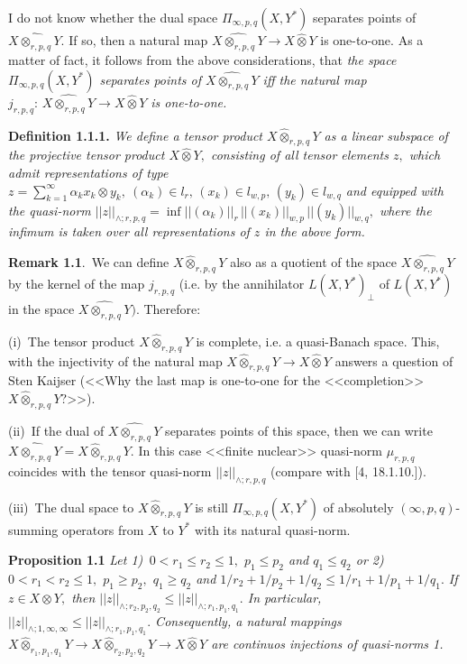  I do not know whether the dual space $\Pi_{\infty,p,q}(X, Y^*)$ sepa\-ra\-tes
 points of $\widehat{X\otimes_{r,p,q} Y}.$ If so, then a natural map
   $\widehat{X\otimes_{r,p,q} Y}\to X\widehat\otimes Y$ is one-to-one. As a matter of fact,
   it follows from the above considerations, that
 {\it the space $\Pi_{\infty,p,q}(X, Y^*)$ separates
 points of $\widehat{X\otimes_{r,p,q} Y}$ iff the natural map
   $j_{r,p,q}:\, \widehat{X\otimes_{r,p,q} Y}\to X\widehat\otimes Y$ is one-to-one.}
       \smallskip

 \textbf{Definition 1.1.1.}  {\it
 We define a tensor product $X\widehat\otimes_{r,p,q} Y$ as a linear subspace of
 the projective tensor product $X\widehat\otimes Y,$ consisting of all tensor elements $z,$
 which admit representations of type
 $
  z=\sum_{k=1}^\infty \alpha_k x_k\otimes y_k,\
  (\alpha_k)\in l_r,\, (x_k)\in l_{w,p},\, (y_k)\in l_{w,q}
 $
 and equipped with the quasi-norm $||z||_{\land\!; r,p,q}= \inf ||(\alpha_k)||_r\,
  ||(x_k)||_{w,p}\, ||(y_k)||_{w,q},$ where the infimum is taken over all
  representations of $z$ in the above form.
  }
       \smallskip

 \textbf{Remark 1.1}.\,
  We can define $X\widehat\otimes_{r,p,q} Y$ also as a quotient of the space $\widehat{X\otimes_{r,p,q} Y}$
 by the kernel of the map $j_{r,p,q}$ (i.e. by the annihilator $L(X,Y^*)_{\perp}$ of
$L(X,Y^*)$ in the space $\widehat{X\otimes_{r,p,q} Y}).$ Therefore:

 (i)\,
 The tensor product $X\widehat\otimes_{r,p,q} Y$ is complete, i.e. a quasi-Banach space.
This, with the injectivity of the natural map $X\widehat\otimes_{r,p,q} Y\to X\widehat\otimes Y$
answers a  question of Sten Kaijser (<<Why the last map is one-to-one
for the <<completion>> $X\widehat\otimes_{r,p,q} Y$?>>).

 (ii)\,
If the dual of $\widehat{X\otimes_{r,p,q} Y}$ separates points of this space,
 then we can write $\widehat{X\otimes_{r,p,q} Y}= X\widehat\otimes_{r,p,q} Y.$ In this case
 <<finite nuclear>> quasi-norm $\mu_{r,p,q}$ coincides with the tensor quasi-norm
$||z||_{\land\!; r,p,q}$ (compare with [4, 18.1.10.]).

(iii)\,
 The dual space to $X\widehat\otimes_{r,p,q} Y$ is still
 $\Pi_{\infty,p,q}(X,Y^*)$ of absolutely $(\infty,p,q)$-summing operators
from $X$ to $Y^*$ with its natural quasi-norm.
                        \smallskip


\textbf{Proposition 1.1} {\it
Let
1)\,
$0<r_1\leqslant r_2\leqslant1,$ $p_1\leqslant p_2$ and $q_1\leqslant q_2$
or
2)\,
 $0<r_1< r_2\leqslant1,$ $p_1\geqslant p_2,$ $q_1\geqslant q_2$ and
 $1/r_2+1/p_2+1/q_2\leqslant 1/r_1+1/p_1+1/q_1.$
If $z\in X\otimes Y,$ then
 $||z||_{\land\!; r_2,p_2,q_2} \leqslant ||z||_{\land\!; r_1,p_1,q_1}.$
In particular,
$||z||_{\land\!; 1,\infty,\infty} \leqslant ||z||_{\land\!; r_1,p_1,q_1}.$
Consequen\-t\-ly, a natural mappings
$X\widehat\otimes_{r_1,p_1,q_1} Y\to X\widehat\otimes_{r_2,p_2,q_2} Y\to X\widehat\otimes Y$ are continuos
injections of quasi-norms 1.
}
                       \smallskip


